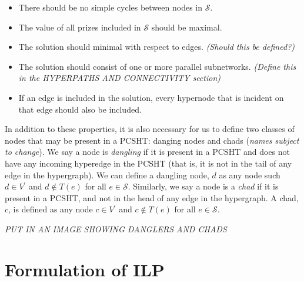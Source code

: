 \documentclass[12pt,twoside]{reedthesis}
\theoremstyle{definition}
\begin{document}
\begin{itemize}
  \item{There should be no simple cycles between nodes in $\mathcal{S}$.}
  \item{The value of all prizes included in $\mathcal{S}$ should be maximal.}
  \item{The solution should minimal with respect to edges. \textit{(Should this be defined?)}}
  \item{The solution should consist of one or more parallel subnetworks. \textit{(Define this in the HYPERPATHS AND CONNECTIVITY section)}}
  \item{If an edge is included in the solution, every hypernode that is incident on that edge should also be included.}
\end{itemize}

In addition to these properties, it is also necessary for us to define two classes of nodes that may be present in a PCSHT: danging nodes and chads (\textit{names subject to change}).  We say a node is \textit{dangling} if it is present in a PCSHT and does not have any incoming hyperedge in the PCSHT (that is, it is not in the tail of any edge in the hypergraph). We can define a dangling node, $d$ as any node such $d \in V^\prime$ and $d \notin T(e)$ for all $e \in \mathcal{S}$. Similarly, we say a node is a \textit{chad} if it is present in a PCSHT, and not in the head of any edge in the hypergraph. A chad, $c$, is defined as any node $c \in V^\prime$ and $c \notin T(e)$ for all $e \in \mathcal{S}$.\par

\textit{PUT IN AN IMAGE SHOWING DANGLERS AND CHADS}

\chapter{Formulation of ILP}
\end{document}
